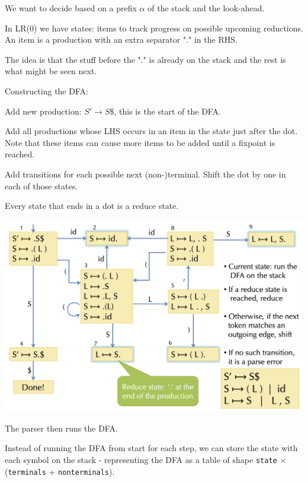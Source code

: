 We want to decide based on a prefix $\alpha$ of the stack and the look-ahead. \medskip
		
In LR(0) we have states: items to track progress on possible upcoming reductions. An item is a production with an extra separator "." in the RHS. \medskip
		
The idea is that the stuff before the "." is already on the stack and the rest is what might be seen next. \medskip
		
Constructing the DFA:
\begin{compactitem}
	\item Add new production: $S' \to S\$$, this is the start of the DFA.
						
	\item Add all productions whose LHS occurs in an item in the state just after the dot. Note that these items can cause more items to be added until a fixpoint is reached.
			
	\item Add transitions for each possible next (non-)terminal. Shift the dot by one in each of those states.
	
	\item Every state that ends in a dot is a reduce state.
\end{compactitem} 

\begin{center}
	\includegraphics[width=0.9\linewidth]{assets/dfa.png}
\end{center}

The parser then runs the DFA.\medskip

Instead of running the DFA from start for each step, we can store the state with each symbol on the stack - representing the DFA as a table of shape \texttt{state} $\times$ (\texttt{terminals} + \texttt{nonterminals}). \medskip

